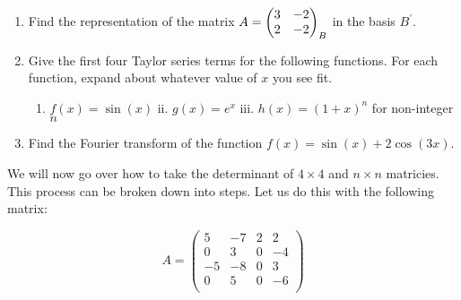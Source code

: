 \documentclass{article}
\begin{document}
\begin{enumerate}
\begin{enumerate}[label=i]
  \end{enumerate}
  \vspace{5cm}
  \item Find the representation of the matrix
  $A=\mqty(3&-2\\2&-2)_B$ in the basis $B^\prime$.
  \vspace{5cm}
    \item Give the first four Taylor series terms for the following functions. For each function, expand about whatever value of $x$ you see fit.
        \begin{enumerate}[label=i.]
                \item $f(x) = \sin(x)$ \hspace{2cm}
                ii. $g(x) = e^x$
                \hspace{2cm} 
                iii. $h(x) = (1 + x)^n$ for non-integer $n$
            \vspace{5cm}
        \end{enumerate}
    \item Find the Fourier transform of the function
    $f(x) = \sin(x) + 2\cos(3x)$.
\end{enumerate}

\newpage

We will now go over how to take the determinant of $4\times 4$ and $n\times n$ matricies. This process can be broken down into steps. Let us do this with the following matrix:

\begin{equation}
  A = \left(\begin{array}{cccc}
    5  & -7  & 2 & 2 \\
    0   & 3  & 0 & -4 \\
    -5   & -8 & 0 & 3 \\
    0   & 5   & 0  & -6 \\
  \end{array}\right)
\end{equation}
\end{document}
